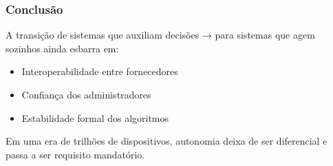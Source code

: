 \documentclass{beamer}
\begin{document}
	\begin{frame}
		\frametitle{Conclusão}
		
		A transição de sistemas que auxiliam decisões → para sistemas que agem sozinhos ainda esbarra em:
		\begin{itemize}
			\item Interoperabilidade entre fornecedores
			\item Confiança dos administradores
			\item Estabilidade formal dos algoritmos
		\end{itemize}
		
		Em uma era de trilhões de dispositivos, autonomia deixa de ser diferencial e passa a ser requisito mandatório.
	\end{frame}
\end{document}
